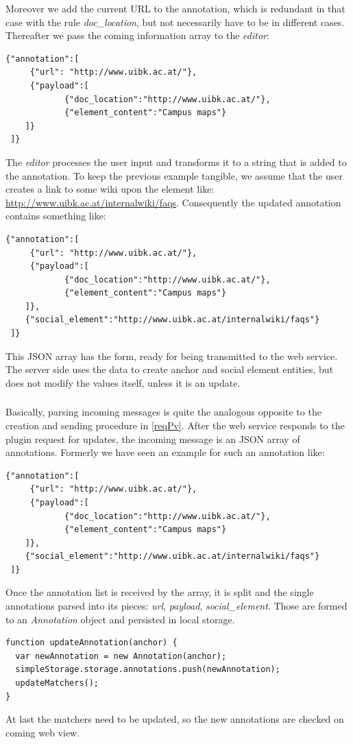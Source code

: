 Moreover we add the current URL to the annotation, which is redundant in that case with the rule \textit{doc\_location}, but not necessarily have to be in different cases. Thereafter we pass the coming  information array to the \textit{editor}:
\begin{lstlisting}
{"annotation":[
	 {"url": "http://www.uibk.ac.at/"},
	 {"payload":[
 			{"doc_location":"http://www.uibk.ac.at/"},
 			{"element_content":"Campus maps"}
 	]}
 ]}
\end{lstlisting}

The \textit{editor} processes the user input and transforms it to a string that is added to the annotation. To keep the previous example tangible, we assume that the user creates a link to some wiki upon the element like: \url{http://www.uibk.ac.at/internalwiki/faqs}. 
Consequently the updated annotation contains something like:
\begin{lstlisting}
{"annotation":[
	 {"url": "http://www.uibk.ac.at/"},
	 {"payload":[
 			{"doc_location":"http://www.uibk.ac.at/"},
 			{"element_content":"Campus maps"}
 	]},
 	{"social_element":"http://www.uibk.ac.at/internalwiki/faqs"}
 ]}
\end{lstlisting}

This JSON array has the form, ready for being transmitted to the web service. The server side uses the data to create anchor and social element entities, but does
 not
 modify the values itself, unless it is an update. 

\subsubsection[Parsing Incoming Messages]{\reqPvi}\label{reqPvi}
Basically, parsing incoming messages is quite the analogous opposite to the creation and sending procedure in \ref{reqPv}. After the web service responds to the plugin request for updates, the incoming message is an JSON array of annotations. Formerly we have seen an example for such an annotation like:
\begin{lstlisting}
{"annotation":[
	 {"url": "http://www.uibk.ac.at/"},
	 {"payload":[
 			{"doc_location":"http://www.uibk.ac.at/"},
 			{"element_content":"Campus maps"}
 	]},
 	{"social_element":"http://www.uibk.ac.at/internalwiki/faqs"}
 ]}
\end{lstlisting}
Once the annotation list is received by the array, it is split and the single annotations parsed into its pieces: \textit{url}, \textit{payload}, \textit{social\_element}. Those are formed to an \textit{Annotation} object and persisted in local storage. 
\begin{lstlisting}
function updateAnnotation(anchor) {
  var newAnnotation = new Annotation(anchor);  
  simpleStorage.storage.annotations.push(newAnnotation);
  updateMatchers();
}
\end{lstlisting}
At last the matchers need to be updated, so the new annotations are checked on coming web view. 


